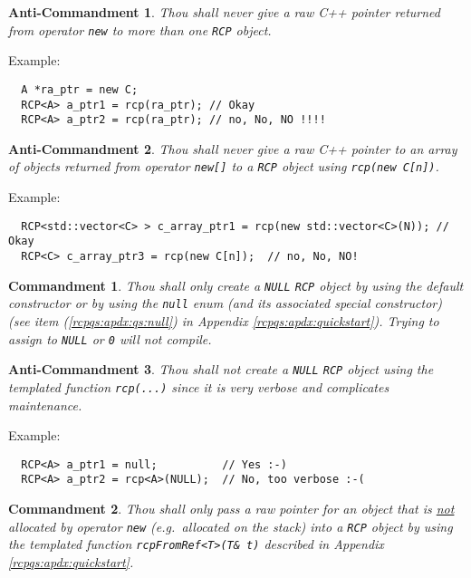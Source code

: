 \documentclass[pdf,ps2pdf,11pt]{SANDreport}
\newtheorem{commandment}{Commandment}
\newtheorem{anticommandment}{Anti-Commandment}
\begin{document}
\begin{anticommandment}
Thou shall never give a raw C++ pointer returned from operator
{}\texttt{new} to more than one {}\texttt{RCP} object.
\end{anticommandment}

{}\noindent{}Example:
{\small\begin{verbatim}
  A *ra_ptr = new C;
  RCP<A> a_ptr1 = rcp(ra_ptr); // Okay
  RCP<A> a_ptr2 = rcp(ra_ptr); // no, No, NO !!!!
\end{verbatim}}

\begin{anticommandment}
Thou shall never give a raw C++ pointer to an array of objects
returned from operator {}\texttt{new[]} to a
{}\texttt{RCP} object using {}\texttt{rcp(new C[n])}.
\end{anticommandment}

{}\noindent{}Example:
{\small\begin{verbatim}
  RCP<std::vector<C> > c_array_ptr1 = rcp(new std::vector<C>(N)); // Okay
  RCP<C> c_array_ptr3 = rcp(new C[n]);  // no, No, NO!
\end{verbatim}}

\begin{commandment}
Thou shall only create a {}\texttt{NULL} {}\texttt{RCP}
object by using the default constructor or by using the
{}\texttt{null} enum (and its associated special constructor) (see
item ({}\ref{rcpqs:apdx:qs:null}) in Appendix
{}\ref{rcpqs:apdx:quickstart}).  Trying to assign to {}\texttt{NULL}
or {}\texttt{0} will not compile.
\end{commandment}

\begin{anticommandment}
Thou shall not create a {}\texttt{NULL} {}\texttt{RCP}
object using the templated function {}\texttt{rcp(...)} since it is
very verbose and complicates maintenance.
\end{anticommandment}

{}\noindent{}Example:
{\small\begin{verbatim}
  RCP<A> a_ptr1 = null;          // Yes :-)
  RCP<A> a_ptr2 = rcp<A>(NULL);  // No, too verbose :-(
\end{verbatim}}

\begin{commandment}
Thou shall only pass a raw pointer for an object that is
{}\underline{not} allocated by operator {}\texttt{new} (e.g.~allocated
on the stack) into a {}\texttt{RCP} object by using the templated
function {}\texttt{rcpFromRef<T>(T\& t)} described in Appendix
{}\ref{rcpqs:apdx:quickstart}.
\end{commandment}
\end{document}
